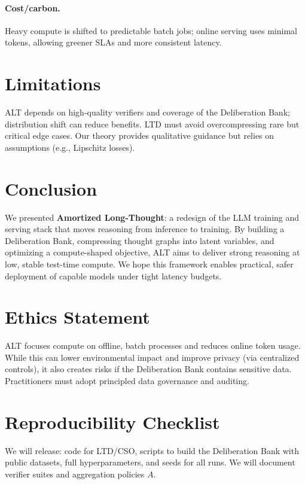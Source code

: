 \documentclass[11pt]{article}
\newcommand{\1}{\mathbf{1}}
\begin{document}
\paragraph{Cost/carbon.} Heavy compute is shifted to predictable batch jobs; online serving uses minimal tokens, allowing greener SLAs and more consistent latency.

\section{Limitations}

ALT depends on high-quality verifiers and coverage of the Deliberation Bank; distribution shift can reduce benefits. LTD must avoid overcompressing rare but critical edge cases. Our theory provides qualitative guidance but relies on assumptions (e.g., Lipschitz losses).

\section{Conclusion}

We presented \textbf{Amortized Long-Thought}: a redesign of the LLM training and serving stack that moves reasoning from inference to training. By building a Deliberation Bank, compressing thought graphs into latent variables, and optimizing a compute-shaped objective, ALT aims to deliver strong reasoning at low, stable test-time compute. We hope this framework enables practical, safer deployment of capable models under tight latency budgets.

\section*{Ethics Statement}
ALT focuses compute on offline, batch processes and reduces online token usage. While this can lower environmental impact and improve privacy (via centralized controls), it also creates risks if the Deliberation Bank contains sensitive data. Practitioners must adopt principled data governance and auditing.

\section*{Reproducibility Checklist}
We will release: code for LTD/CSO, scripts to build the Deliberation Bank with public datasets, full hyperparameters, and seeds for all runs. We will document verifier suites and aggregation policies $A$.

\appendix
\end{document}
